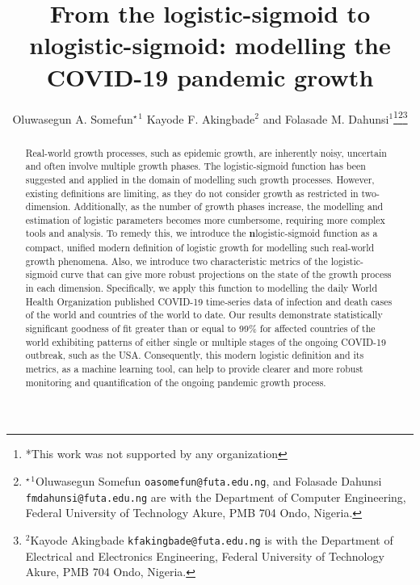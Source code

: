 \documentclass[journal]{IEEEtran}
\theoremstyle{plain}
\theoremstyle{definition}
\theoremstyle{remark}
\begin{document}
\title{From the logistic-sigmoid to \textbf{n}logistic-sigmoid: modelling the COVID-19 pandemic growth}
\author{Oluwasegun A. Somefun$^{\star\,1}$ Kayode F. Akingbade$^{2}$ and Folasade M. Dahunsi$^{1}$\thanks{*This work was not supported by any organization}\thanks{$^{\star\,1}$Oluwasegun Somefun {\tt\footnotesize oasomefun@futa.edu.ng}, and Folasade Dahunsi  {\tt\footnotesize  fmdahunsi@futa.edu.ng} are with the Department of Computer Engineering, Federal University of Technology Akure, PMB 704 Ondo, Nigeria.
}\thanks{$^{2}$Kayode Akingbade {\tt\footnotesize kfakingbade@futa.edu.ng} is with the Department of Electrical and Electronics Engineering, Federal University of Technology Akure, PMB 704 Ondo, Nigeria.
}}


\maketitle



\begin{abstract}
Real-world growth processes, such as epidemic growth, are inherently noisy, uncertain and often involve multiple growth phases. The logistic-sigmoid function has been suggested and applied in the domain of modelling such growth processes. However, existing definitions are limiting, as they do not consider growth as restricted in two-dimension. Additionally, as the number of growth phases increase, the modelling and estimation of logistic parameters becomes more cumbersome, requiring more complex tools and analysis. To remedy this, we introduce the \textbf{n}logistic-sigmoid function as a compact, unified modern definition of logistic growth for modelling such real-world growth phenomena. Also, we introduce two characteristic metrics of the logistic-sigmoid curve that can give more robust projections on the state of the growth process in each dimension.  Specifically, we apply this function to modelling the daily World Health Organization published COVID-19 time-series data of infection and death cases of the world and countries of the world to date. Our results demonstrate statistically significant goodness of fit greater than or equal  to 99\% for affected countries of the world exhibiting patterns of either single or multiple stages of the ongoing COVID-19 outbreak, such as the USA. Consequently, this modern logistic definition and its metrics, as a machine learning tool, can help to provide clearer and more robust monitoring and quantification of the ongoing pandemic growth process.
\end{abstract}
\end{document}
